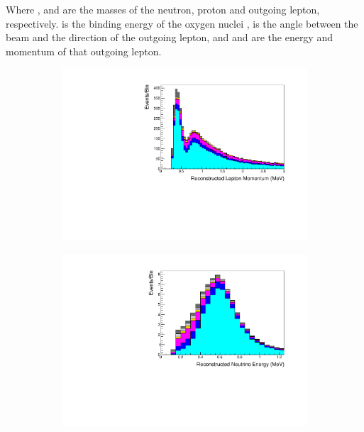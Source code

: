 Where ,  and  are the masses of the neutron, proton and outgoing lepton, respectively.  is the binding energy of the oxygen nuclei \cite{t2k_tn_399},  is the angle between the beam and the direction of the outgoing lepton, and  and  are the energy and momentum of that outgoing lepton.

\begin{figure}[h]
  \begin{subfigure}[t]{0.49\textwidth}
    \includegraphics[width=\textwidth, trim={0mm 0mm 0mm 0mm}, clip,page=1]{Figures/Selections/FHC1Rmu-2020_X.pdf}
  \end{subfigure}%
  \begin{subfigure}[t]{0.49\textwidth}
    \includegraphics[width=\textwidth, trim={0mm 0mm 0mm 0mm}, clip,page=1]{Figures/Selections/FHC1Re-2020_X.pdf}

\end{subfigure}
\end{figure}
